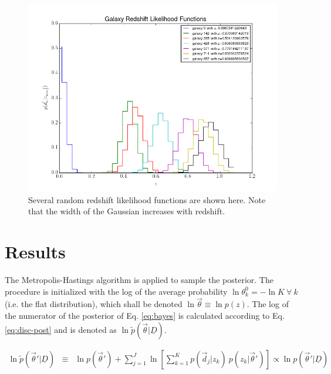 \documentclass[12pt, onecolumn]{emulateapj}
\newcommand{\textul}{\underline}
\begin{document}
\begin{figure}
\label{fig:pzs}
\includegraphics[scale=0.5]{lik-samps.png}
\caption{Several random redshift likelihood functions are shown here.  Note that the width of the Gaussian increases with redshift.}
\end{figure}

\section{Results}

The Metropolis-Hastings algorithm is applied to sample the posterior.  The procedure is initialized with the log of the average probability $\ln\theta^{0}_{k}=-\ln K\ \forall\ k$ (i.e. the flat distribution), which shall be denoted $\ln\vec{\theta}\equiv\ln p(z)$.  The log of the numerator of the posterior of Eq. \ref{eq:bayes} is calculated according to Eq. \ref{eq:disc-post} and is denoted as $\ln\tilde{p}(\vec{\theta}|\textul{D})$.  

\begin{eqnarray}
\label{eq:disc-post}
\ln\tilde{p}(\vec{\theta}'|\textul{D}) &\equiv& \ln p(\vec{\theta}') + \sum_{j=1}^{J}\ln\left[\sum_{k=1}^{K}p(\vec{d}_{j}|z_{k})\ p(z_{k}|\vec{\theta}')\right] \propto \ln p(\vec{\theta}'|\textul{D})\\
\end{eqnarray}
\end{document}
